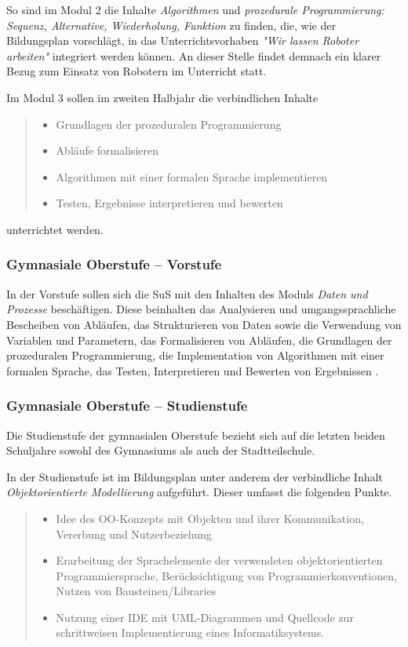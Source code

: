 \documentclass[paper=a4, DIV=calc, BCOR=12mm, twoside=on, onecolumn=on, open = right, titlepage =on, parskip =half-, headsepline = on, footsepline = off, chapterprefix = off, appendixprefix = on, fontsize = 12pt, numbers = noenddot, abstract = on]{scrbook}
\begin{document}
So sind im Modul 2 die Inhalte \emph{Algorithmen} und \emph{prozedurale Programmierung: Sequenz, Alternative, Wiederholung, Funktion} zu finden, die, wie der Bildungsplan vorschlägt, in das Unterrichtsvorhaben \emph{"Wir lassen Roboter arbeiten"} integriert werden können. An dieser Stelle findet demnach ein klarer Bezug zum Einsatz von Robotern im Unterricht statt.

Im Modul 3 sollen im zweiten Halbjahr die verbindlichen Inhalte
\begin{quote}
\begin{itemize}
\item Grundlagen der prozeduralen Programmierung
\item Abläufe formalisieren
\item Algorithmen mit einer formalen Sprache implementieren
\item Testen, Ergebnisse interpretieren und bewerten \hfill \cite{stsmittel:14}
\end{itemize}
\end{quote}
unterrichtet werden.  

\vspace*{-1ex}
\subsubsection{Gymnasiale Oberstufe -- Vorstufe}

In der Vorstufe sollen sich die SuS mit den Inhalten des Moduls \emph{Daten und Prozesse} beschäftigen. Diese beinhalten das Analysieren und umgangssprachliche Bescheiben von Abläufen, das Strukturieren von Daten sowie die Verwendung von Variablen und Parametern, das Formalisieren von Abläufen, die Grundlagen der prozeduralen Programmierung, die Implementation von Algorithmen mit einer formalen Sprache, das Testen, Interpretieren und Bewerten von Ergebnissen \cite{oberstufe:09}. 
\vspace*{-1ex}
\subsubsection{Gymnasiale Oberstufe -- Studienstufe}
Die Studienstufe der gymnasialen Oberstufe bezieht sich auf die letzten beiden Schuljahre sowohl des Gymnasiums als auch der Stadtteilschule.

In der Studienstufe ist im Bildungsplan unter anderem der verbindliche Inhalt \emph{Objektorientierte Modellierung} aufgeführt. Dieser umfasst die folgenden Punkte.
\begin{quote}
\begin{itemize}
\item Idee des OO-Konzepts mit Objekten und ihrer Kommunikation, Vererbung und Nutzerbeziehung
\item Erarbeitung der Sprachelemente der verwendeten objektorientierten Programmiersprache, Berücksichtigung von Programmierkonventionen, Nutzen von Bausteinen/Libraries
\item Nutzung einer IDE mit UML-Diagrammen und Quellcode zur schrittweisen Implementierung eines Informatiksystems. \qquad \cite{oberstufe:09}
\end{itemize}
\end{quote}
\end{document}
